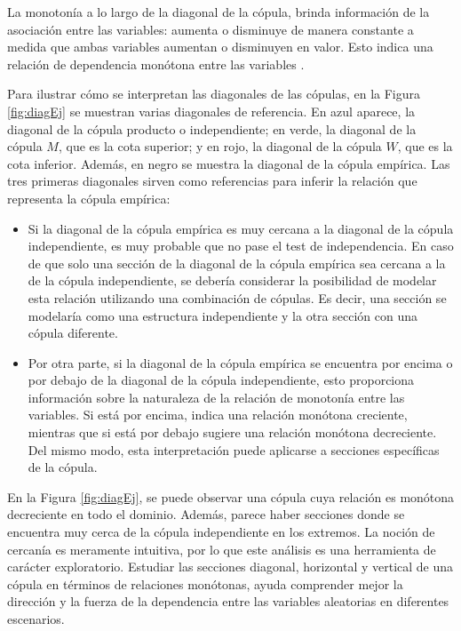 La monotonía a lo largo de la diagonal de la cópula, brinda información de la asociación entre las variables: aumenta o disminuye de manera constante a medida que ambas variables aumentan o disminuyen en valor. Esto indica una relación de dependencia monótona entre las variables \cite{TesisEmanuel}.

Para ilustrar cómo se interpretan las diagonales de las cópulas, en la Figura \ref{fig:diagEj} se muestran varias diagonales de referencia. En azul aparece, la diagonal de la cópula producto o independiente; en verde, la diagonal de la cópula $M$, que es la cota superior; y en rojo, la diagonal de la cópula $W$, que es la cota inferior. Además, en negro se muestra la diagonal de la cópula empírica. Las tres primeras diagonales sirven como referencias para inferir la relación que representa la cópula empírica:

\begin{itemize}
    \item Si la diagonal de la cópula empírica es muy cercana a la diagonal de la cópula independiente, es muy probable que no pase el test de independencia. En caso de que solo una sección de la diagonal de la cópula empírica sea cercana a la de la cópula independiente, se debería considerar la posibilidad de modelar esta relación utilizando una combinación de cópulas. Es decir, una sección se modelaría como una estructura independiente y la otra sección con una cópula diferente.

    \item Por otra parte, si la diagonal de la cópula empírica se encuentra por encima o por debajo de la diagonal de la cópula independiente, esto proporciona información sobre la naturaleza de la relación de monotonía entre las variables. Si está por encima, indica una relación monótona creciente, mientras que si está por debajo sugiere una relación monótona decreciente. Del mismo modo, esta interpretación puede aplicarse a secciones específicas de la cópula.
\end{itemize}

En la Figura \ref{fig:diagEj}, se puede observar una cópula cuya relación es monótona decreciente en todo el dominio. Además, parece haber secciones donde se encuentra muy cerca de la cópula independiente en los extremos. La noción de cercanía es meramente intuitiva, por lo que este análisis es una herramienta de carácter exploratorio. Estudiar las secciones diagonal, horizontal y vertical de una cópula en términos de relaciones monótonas, ayuda comprender mejor la dirección y la fuerza de la dependencia entre las variables aleatorias en diferentes escenarios. 



